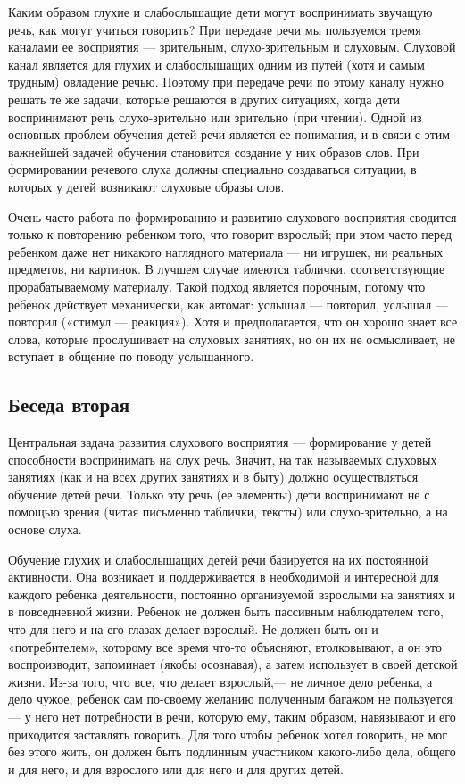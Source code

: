 \documentclass[a5paper]{book}
\begin{document}
Каким образом глухие и слабослышащие дети могут воспринимать звучащую
речь, как могут учиться говорить? При передаче речи мы пользуемся тремя
каналами ее восприятия --- зрительным, слухо-зрительным и слуховым.
Слуховой канал является для глухих и слабослышащих одним из путей (хотя
и самым трудным) овладение речью. Поэтому при передаче речи по этому
каналу нужно решать те же задачи, которые решаются в других ситуациях,
когда дети воспринимают речь слухо-зрительно или зрительно (при чтении).
Одной из основных проблем обучения детей речи является ее понимания, и в
связи с этим важнейшей задачей обучения становится создание у них
образов слов. При формировании речевого слуха должны специально
создаваться ситуации, в которых у детей возникают слуховые образы слов.

Очень часто работа по формированию и развитию слухового восприятия
сводится только к повторению ребенком того, что говорит взрослый; при
этом часто перед ребенком даже нет никакого наглядного материала --- ни
игрушек, ни реальных предметов, ни картинок. В лучшем случае имеются
таблички, соответствующие прорабатываемому материалу. Такой подход
является порочным, потому что ребенок действует механически, как
автомат: услышал --- повторил, услышал --- повторил («стимул ---
реакция»). Хотя и предполагается, что он хорошо знает все слова, которые
прослушивает на слуховых занятиях, но он их не осмысливает, не вступает
в общение по поводу услышанного.

\subsection*{Беседа вторая}

Центральная задача развития слухового восприятия --- формирование у
детей способности воспринимать на слух речь. Значит, на так называемых
слуховых занятиях (как и на всех других занятиях и в быту) должно
осуществляться обучение детей речи. Только эту речь (ее элементы) дети
воспринимают не с помощью зрения (читая письменно таблички, тексты) или
слухо-зрительно, а на основе слуха.

Обучение глухих и слабослышащих детей речи базируется на их постоянной
активности. Она возникает и поддерживается в необходимой и интересной
для каждого ребенка деятельности, постоянно организуемой взрослыми на
занятиях и в повседневной жизни. Ребенок не должен быть пассивным
наблюдателем того, что для него и на его глазах делает взрослый. Не
должен быть он и «потребителем», которому все время что-то объясняют,
втолковывают, а он это воспроизводит, запоминает (якобы осознавая), а
затем использует в своей детской жизни. Из-за того, что все, что делает
взрослый,--- не личное дело ребенка, а дело чужое, ребенок сам по-своему
желанию полученным багажом не пользуется --- у него нет потребности в
речи, которую ему, таким образом, навязывают и его приходится заставлять
говорить. Для того чтобы ребенок хотел говорить, не мог без этого жить,
он должен быть подлинным участником какого-либо дела, общего и для него,
и для взрослого или для него и для других детей.
\end{document}
